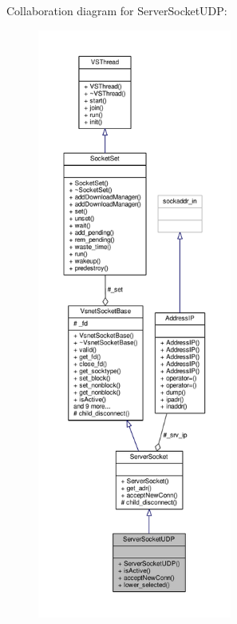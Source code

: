 Collaboration diagram for Server\+Socket\+U\+DP\+:
\nopagebreak
\begin{figure}[H]
\begin{center}
\leavevmode
\includegraphics[height=550pt]{dc/dfe/classServerSocketUDP__coll__graph}
\end{center}
\end{figure}
